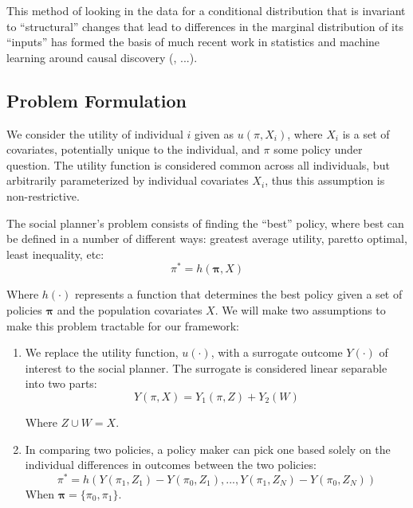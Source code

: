 \documentclass[a4paper,12pt]{article}
\begin{document}
This method of looking in the data for a conditional distribution that is invariant to ``structural'' changes that lead to differences in the marginal distribution of its ``inputs'' has formed the basis of much recent work in statistics and machine learning around causal discovery (\cite{peters2015}, ...). 




\subsection*{Problem Formulation}

We consider the utility of individual $i$ given as $ u(\pi, X_i)$, where $X_i$ is a set of covariates, potentially unique to the individual, and $\pi$ some policy under question. The utility function is considered common across all individuals, but arbitrarily parameterized by individual covariates $X_i$, thus this assumption is non-restrictive. 

The social planner's problem consists of finding the ``best'' policy, where best can be defined in a number of different ways: greatest average utility, paretto optimal, least inequality, etc:
%
$$
\pi^* = h(\bm{\pi}, X)
$$

Where $h(\cdot)$ represents a function that determines the best policy given a set of policies $\bm{\pi}$ and the population covariates $X$. We will make two assumptions to make this problem tractable for our framework: 

\begin{enumerate}
\item We replace the utility function, $u(\cdot)$, with a surrogate outcome $Y(\cdot)$ of interest to the social planner. The surrogate is considered linear separable into two parts: 
%
$$
Y(\pi, X) = Y_1(\pi, Z) + Y_2(W)
$$

Where $Z \cup W = X$.

\item In comparing two policies, a policy maker can pick one based solely on the individual differences in outcomes between the two policies: 
%
$$
\pi^* = h(Y(\pi_1, Z_1) - Y(\pi_0, Z_1),...,Y(\pi_1, Z_N) - Y(\pi_0, Z_N))
$$
When $\bm{\pi} = \{\pi_0, \pi_1\}$.
\end{enumerate}
\end{document}
